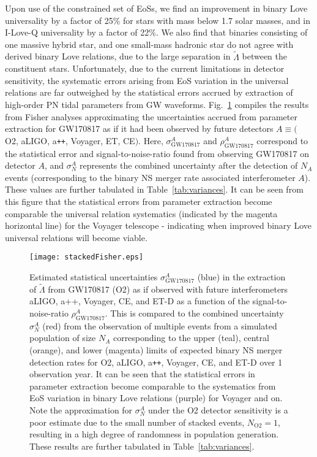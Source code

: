 \documentclass[prd,twocolumn,nofootinbib,superscriptaddress,amsmath,amssymb]{revtex4-1}
\begin{document}
Upon use of the constrained set of EoSs, we find an improvement in binary Love universality by a factor of 25\% for stars with mass below 1.7 solar masses, and in I-Love-Q universality by a factor of 22\%.
We also find that binaries consisting of one massive hybrid star, and one small-mass hadronic star do not agree with derived binary Love relations, due to the large separation in $\tilde{\Lambda}$ between the constituent stars.
Unfortunately, due to the current limitations in detector sensitivity, the systematic errors arising from EoS variation in the universal relations are far outweighed by the statistical errors accrued by extraction of high-order PN tidal parameters from GW waveforms.
Fig.~\ref{fig:stackedFisher} compiles the results from Fisher analyses approximating the uncertainties accrued from parameter extraction for GW170817 as if it had been observed by future detectors $A \equiv ($ O2, aLIGO, a\texttt{++}, Voyager, ET, CE$)$.
Here, $\sigma^A_{\text{GW170817}}$ and $\rho^A_{\text{GW170817}}$ correspond to the statistical error and signal-to-noise-ratio found from observing GW170817 on detector $A$, and $\sigma^A_N$ represents the combined uncertainty after the detection of $N_A$ events (corresponding to the binary NS merger rate associated interferometer $A$).
These values are further tabulated in Table~\ref{tab:variances}.
It can be seen from this figure that the statistical errors from parameter extraction become comparable the universal relation systematics (indicated by the magenta horizontal line) for the Voyager telescope - indicating when improved binary Love universal relations will become viable.
\begin{figure}
\begin{center} 
\texttt{[image: stackedFisher.eps]}
\end{center}
\caption{
Estimated statistical uncertainties $\sigma^A_{\text{GW170817}}$ (blue) in the extraction of $\tilde{\Lambda}$ from GW170817 (O2) as if observed with future interferometers aLIGO, a++, Voyager, CE, and ET-D as a function of the signal-to-noise-ratio $\rho^A_{\text{GW170817}}$.
This is compared to the combined uncertainty $\sigma^A_N$ (red) from the observation of multiple events from a simulated population of size $N_A$ corresponding to the upper (teal), central (orange), and lower (magenta) limits of expected binary NS merger detection rates for O2, aLIGO, a\texttt{++}, Voyager, CE, and ET-D over 1 observation year.
It can be seen that the statistical errors in parameter extraction become comparable to the systematics from EoS variation in binary Love relations (purple) for Voyager and on.
Note the approximation for $\sigma^A_N$ under the O2 detector sensitivity is a poor estimate due to the small number of stacked events, $N_{\text{O2}}=1$, resulting in a high degree of randomness in population generation.
These results are further tabulated in Table~\ref{tab:variances}.
}
\label{fig:stackedFisher}
\end{figure} 
\end{document}
